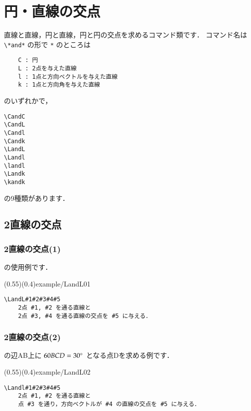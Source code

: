 \section{円・直線の交点}
直線と直線，円と直線，円と円の交点を求めるコマンド類です．
コマンド名は \verb+\*and*+ の形で \texttt{*} のところは

\begin{jquote}
\begin{verbatim}
    C : 円
    L : 2点を与えた直線
    l : 1点と方向ベクトルを与えた直線
    k : 1点と方向角を与えた直線
\end{verbatim}
\end{jquote}
のいずれかで，
\begin{jquote}
\begin{verbatim}
\CandC
\CandL
\Candl
\Candk
\LandL
\Landl
\landl
\Landk
\kandk
\end{verbatim}
\end{jquote}
の9種類があります．

\subsection{2直線の交点}
\subsubsection{2直線の交点(1) \texorpdfstring{}{LandL}}

 の使用例です．

(0.55)(0.4){example/LandL01}

\begin{boxnote}
\begin{verbatim}
\LandL#1#2#3#4#5
    2点 #1, #2 を通る直線と
    2点 #3, #4 を通る直線の交点を #5 に与える．
\end{verbatim}
\end{boxnote}

\subsubsection{2直線の交点(2) \texorpdfstring{}{Landl}}
 の辺AB上に $60{BCD}=30^{\circ}$ となる点Dを求める例です．

(0.55)(0.4){example/LandL02}

\begin{boxnote}
\begin{verbatim}
\Landl#1#2#3#4#5
    2点 #1, #2 を通る直線と
    点 #3 を通り，方向ベクトルが #4 の直線の交点を #5 に与える．
\end{verbatim}
\end{boxnote}

